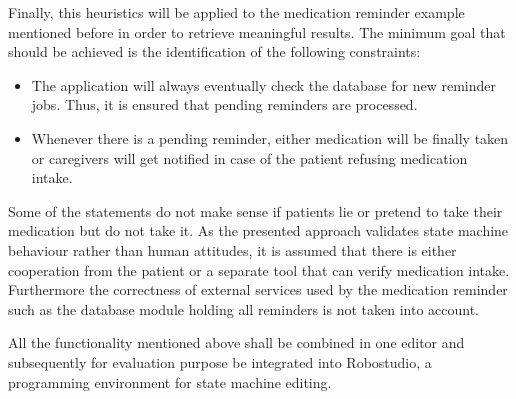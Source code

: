 Finally, this heuristics will be applied to the medication reminder example mentioned before in order to retrieve meaningful results. The minimum goal that should be achieved is the identification of the following constraints:

\begin{itemize}
	\item The application will always eventually check the database for new reminder jobs. Thus, it is ensured that pending reminders are processed.
	\item Whenever there is a pending reminder, either medication will be finally taken or caregivers will get notified in case of the patient refusing medication intake.
\end{itemize}

Some of the statements do not make sense if patients lie or pretend to take their medication but do not take it. As the presented approach validates state machine behaviour rather than human attitudes, it is assumed that there is either cooperation from the patient or a separate tool that can verify medication intake. Furthermore the correctness of external services used by the medication reminder such as the database module holding all reminders is not taken into account.

All the functionality mentioned above shall be combined in one editor and subsequently for evaluation purpose be integrated into Robostudio, a programming environment for state machine editing.